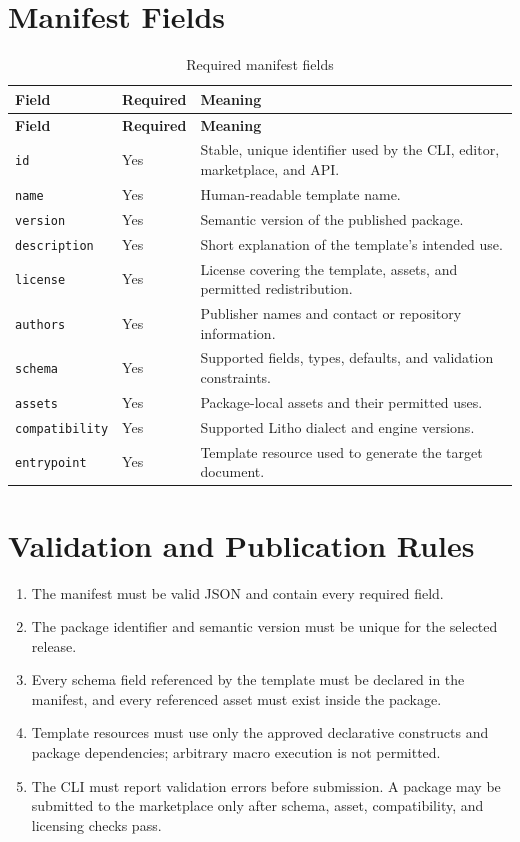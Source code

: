 \section{Manifest Fields}
\begin{xltabular}{\textwidth}{@{}p{0.24\textwidth}p{0.16\textwidth}X@{}}
\caption{Required manifest fields}\label{tab:manifest-fields}\\
\toprule
\textbf{Field} & \textbf{Required} & \textbf{Meaning} \\
\midrule
\endfirsthead
\toprule
\textbf{Field} & \textbf{Required} & \textbf{Meaning} \\
\midrule
\endhead
\texttt{id} & Yes & Stable, unique identifier used by the CLI, editor, marketplace, and API. \\
\texttt{name} & Yes & Human-readable template name. \\
\texttt{version} & Yes & Semantic version of the published package. \\
\texttt{description} & Yes & Short explanation of the template's intended use. \\
\texttt{license} & Yes & License covering the template, assets, and permitted redistribution. \\
\texttt{authors} & Yes & Publisher names and contact or repository information. \\
\texttt{schema} & Yes & Supported fields, types, defaults, and validation constraints. \\
\texttt{assets} & Yes & Package-local assets and their permitted uses. \\
\texttt{compatibility} & Yes & Supported Litho dialect and engine versions. \\
\texttt{entrypoint} & Yes & Template resource used to generate the target document. \\
\bottomrule
\end{xltabular}

\section{Validation and Publication Rules}
\begin{enumerate}
  \item The manifest must be valid JSON and contain every required field.
  \item The package identifier and semantic version must be unique for the selected
  release.
  \item Every schema field referenced by the template must be declared in the
  manifest, and every referenced asset must exist inside the package.
  \item Template resources must use only the approved declarative constructs and
  package dependencies; arbitrary macro execution is not permitted.
  \item The CLI must report validation errors before submission. A package may be
  submitted to the marketplace only after schema, asset, compatibility, and
  licensing checks pass.
\end{enumerate}
